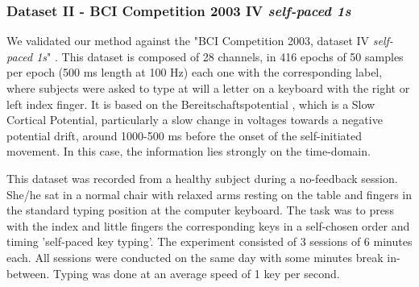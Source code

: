    
   


\subsubsection{Dataset II - BCI Competition 2003 IV \textit{self-paced 1s}}
We validated our method against the "BCI Competition 2003, dataset IV \textit{self-paced 1s}" \cite{c51}. This dataset is composed of 28 channels, in 416 epochs of 50 samples per epoch (500 ms length at 100 Hz) each one with the corresponding label, where subjects were asked to type at will a letter on a keyboard with the right or left index finger.  It is based on the Bereitschaftspotential \cite{c52}, which is a Slow Cortical Potential, particularly a slow change in voltages towards a negative potential drift, around 1000-500 ms before the onset of the self-initiated movement.  In this case, the information lies strongly on the time-domain.

This dataset was recorded from a healthy subject during a no-feedback session. She/he sat in a normal chair with relaxed arms resting on the table and fingers in the standard typing position at the computer keyboard. The task was to press with the index and little fingers the corresponding keys in a self-chosen order and timing 'self-paced key typing'. The experiment consisted of 3 sessions of 6 minutes each. All sessions were conducted on the same day with some minutes break in-between. Typing was done at an average speed of 1 key per second.  
